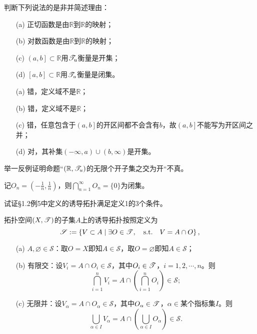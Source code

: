 \begin{xiti}
	\item 判断下列说法的是非并简述理由：
	\begin{enumerate}
		\item[(a)] 正切函数是由$\mathbb{R}$到$\mathbb{R}$的映射；
		\item[(b)] 对数函数是由$\mathbb{R}$到$\mathbb{R}$的映射；
		\item[(c)] $\left(a,b\right]\subset \mathbb{R}$用$\mathscr{T}_u$衡量是开集；
		\item[(d)] $\left[a,b\right]\subset \mathbb{R}$用$\mathscr{T}_u$衡量是闭集。
	\end{enumerate}
	
	\begin{jie}
		\begin{enumerate}
			\item[(a)] 错，定义域不是$\mathbb{R}$；
			\item[(b)] 错，定义域不是$\mathbb{R}$；
			\item[(c)] 错，任意包含于$\left(a,b\right]$的开区间都不会含有$b$，故$\left(a,b\right]$不能写为开区间之并；
			\item[(d)] 对，其补集$(-\infty,a)\cup (b,\infty)$是开集。
		\end{enumerate}
	\end{jie}

	
	\item 举一反例证明命题“$\left(\mathbb{R},\mathscr{T}_u\right)$的无限个开子集之交为开“不真。
	
	\begin{zm}
		记$\displaystyle O_n=\left(-\frac{1}{n},\frac{1}{n}\right)$，则$\displaystyle\bigcap_{n=1}^{\infty} O_n=\{0\}$为闭集。
	\end{zm}
	
	\item 试证\S 1.2例5中定义的诱导拓扑满足定义1的3个条件。
	
	\begin{zm}
		拓扑空间$(X,\mathscr{T})$的子集$A$上的诱导拓扑按照定义为
		$$ \mathscr{S}:=\left\{ V\subset A\mid \exists O\in \TT, \qq{s.t.}V=A\cap O \right\}, $$
		\begin{enumerate}
			\item[(a)] $A,\varnothing \in \mathscr{S}$：取$O=X$即知$A\in\mathscr{S}$，取$O=\varnothing$即知$A\in \mathscr{S}$；
			\item[(b)] 有限交：设$V_i=A\cap O_i\in \mathscr{S}$，其中$O_i\in\mathscr{T} $，$i=1,2,\cdots,n$。则
			\begin{equation*}
			\bigcap_{i=1}^n V_i =A\cap \left(\bigcap_{i=1}^n O_i \right)\in \mathscr{S};
			\end{equation*}
			\item[(c)] 无限并：设$V_\alpha=A\cap O_\alpha \in \mathscr{S}$，其中$O_\alpha\in\mathscr{T} $，$\alpha\in \text{某个指标集} I$。则
			\begin{equation*}
			\bigcup_{\alpha\in I} V_\alpha =A\cap \left(\bigcup_{\alpha\in I} O_\alpha \right)\in \mathscr{S}.
			\end{equation*}
		\end{enumerate}
	\end{zm}


\end{xiti}
